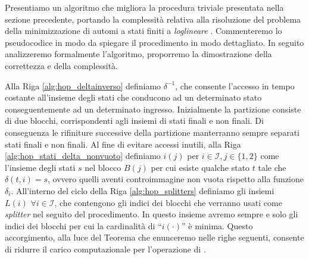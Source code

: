 Presentiamo un algoritmo che migliora la procedura triviale presentata nella sezione precedente, portando la complessità relativa alla risoluzione del problema della minimizzazione di automi a stati finiti a \emph{loglineare} \cite{hopcroft}. Commenteremo lo pseudocodice in modo da spiegare il procedimento in modo dettagliato. In seguito analizzeremo formalmente l'algoritmo, proporremo la dimostrazione della correttezza e della complessità.

Alla Riga \ref{alg:hop_deltainverso} definiamo $\delta^{-1}$, che consente l'accesso in tempo costante all'insieme degli stati che conducono ad un determinato stato conseguentemente ad un determinato ingresso.  Inizialmente la partizione consiste di due blocchi, corrispondenti agli insiemi di stati finali e non finali. Di conseguenza le rifiniture successive della partizione manterranno sempre separati stati finali e non finali. Al fine di evitare accessi inutili, alla Riga \ref{alg:hop_stati_delta_nonvuoto} definiamo $i(j)$ per $i \in \mathcal{I}, j \in \{1,2\}$ come l'insieme degli stati $s$ nel blocco $B(j)$ per cui esiste qualche stato $t$ tale che $\delta(t,i) = s$, ovvero quelli aventi controimmagine non vuota rispetto alla funzione $\delta_i$. All'interno del ciclo della Riga \ref{alg:hop_splitters} definiamo gli insiemi $L(i)\,\, \forall i \in \mathcal{I}$, che contengono gli indici dei blocchi che verranno usati come \emph{splitter} nel seguito del procedimento. In questo insieme avremo sempre e solo gli indici dei blocchi per cui la cardinalità di ``$i(\cdot)$'' è minima. Questo accorgimento, alla luce del Teorema che enunceremo nelle righe seguenti, consente di ridurre il carico computazionale per l'operazione di \splitfunc.

